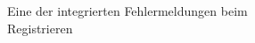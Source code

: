 \documentclass[notables, nomenclature, oneside, 150]{HSMW-Thesis}
\begin{document}
\begin{figure}[h]
\begin{subfigure}[t]{0.3\textwidth}
        	\caption{Eine der integrierten Fehlermeldungen beim Registrieren}
        	\label{fig:9}
    	\end{subfigure}
    	\begin{subfigure}[t]{0.3\textwidth}

\end{subfigure}
\end{figure}
\end{document}
